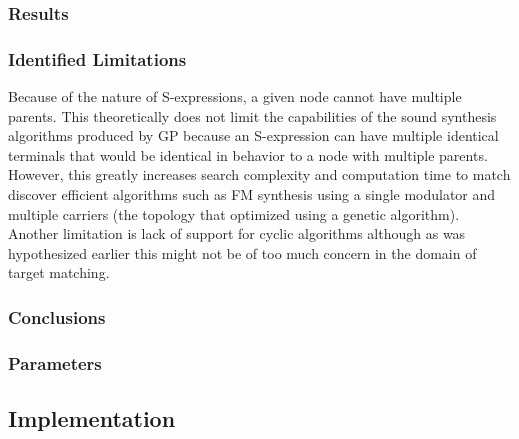 \documentclass[12pt]{article}
\begin{document}
\subsubsection{Results}
\subsubsection{Identified Limitations}
Because of the nature of S-expressions, a given node cannot have multiple parents. This theoretically does not limit the capabilities of the sound synthesis algorithms produced by GP because an S-expression can have multiple identical terminals that would be identical in behavior to a node with multiple parents. However, this greatly increases search complexity and computation time to match discover efficient algorithms such as FM synthesis using a single modulator and multiple carriers (the topology that \citep{horner1993machine} optimized using a genetic algorithm). Another limitation is lack of support for cyclic algorithms although as was hypothesized earlier this might not be of too much concern in the domain of target matching.
\subsubsection{Conclusions}
\subsubsection{Parameters}


\subsection{Implementation}
\end{document}
